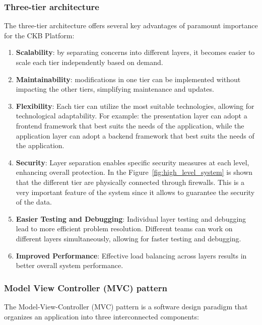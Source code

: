 \subsubsection{Three-tier architecture}
The three-tier architecture offers several key advantages of paramount importance for the CKB Platform:
\begin{enumerate}
    \item \textbf{Scalability}: by separating concerns into different layers, it becomes easier to scale each tier independently based on demand.
    \item \textbf{Maintainability}: modifications in one tier can be implemented without impacting the other tiers, simplifying maintenance and updates.
    \item \textbf{Flexibility}: Each tier can utilize the most suitable technologies, allowing for technological adaptability. For example: the presentation layer can adopt a frontend framework that best suits the needs of the application, while the application layer can adopt a backend framework that best suits the needs of the application.
    \item \textbf{Security}: Layer separation enables specific security measures at each level, enhancing overall protection. In the Figure\ \ref{fig:high_level_system} is shown that the different tier are physically connected through firewalls. This is a very important feature of the system since it allows to guarantee the security of the data.
    \item \textbf{Easier Testing and Debugging}: Individual layer testing and debugging lead to more efficient problem resolution. Different teams can work on different layers simultaneously, allowing for faster testing and debugging.
    \item \textbf{Improved Performance}: Effective load balancing across layers results in better overall system performance.
\end{enumerate}
\subsubsection{Model View Controller (MVC) pattern}
The Model-View-Controller (MVC) pattern is a software design paradigm that organizes an application into three interconnected components:

